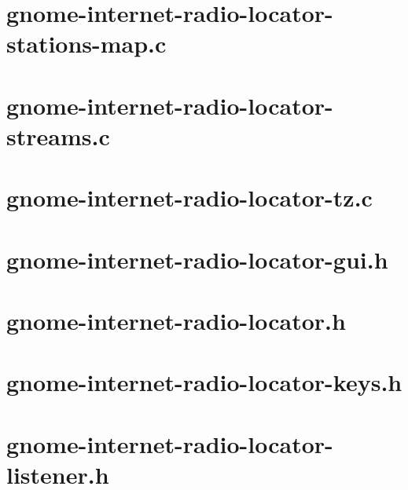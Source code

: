 \documentclass[a4paper,norsk,utf8]{report}
\begin{document}
\section{gnome-internet-radio-locator-stations-map.c}



\section{gnome-internet-radio-locator-streams.c}



\section{gnome-internet-radio-locator-tz.c}



\section{gnome-internet-radio-locator-gui.h}



\section{gnome-internet-radio-locator.h}



\section{gnome-internet-radio-locator-keys.h}



\section{gnome-internet-radio-locator-listener.h}


\end{document}
